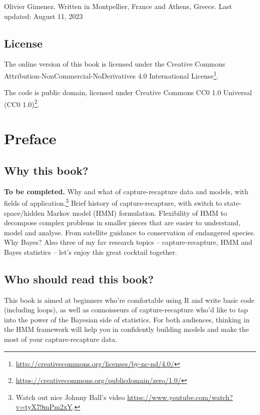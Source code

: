 \documentclass[
  12pt,
]{krantz}
\renewcommand{\href}[2]{#2\footnote{\url{#1}}}
\begin{document}
Olivier Gimenez. Written in Montpellier, France and Athens, Greece.
Last updated: August 11, 2023

\hypertarget{license}{%
\section*{License}\label{license}}


The online version of this book is licensed under the \href{http://creativecommons.org/licenses/by-nc-nd/4.0/}{Creative Commons Attribution-NonCommercial-NoDerivatives 4.0 International License}.

The code is public domain, licensed under \href{https://creativecommons.org/publicdomain/zero/1.0/}{Creative Commons CC0 1.0 Universal (CC0 1.0)}.

\hypertarget{preface}{%
\chapter*{Preface}\label{preface}}


\hypertarget{why-this-book}{%
\section*{Why this book?}\label{why-this-book}}


\textbf{To be completed.} Why and what of capture-recapture data and models, with fields of application.\footnote{Watch out nice Johnny Ball's video \url{https://www.youtube.com/watch?v=tyX79mPm2xY}.} Brief history of capture-recapture, with switch to state-space/hidden Markov model (HMM) formulation. Flexibility of HMM to decompose complex problems in smaller pieces that are easier to understand, model and analyse. From satellite guidance to conservation of endangered species. Why Bayes? Also three of my fav research topics -- capture-recapture, HMM and Bayes statistics -- let's enjoy this great cocktail together.

\hypertarget{who-should-read-this-book}{%
\section*{Who should read this book?}\label{who-should-read-this-book}}


This book is aimed at beginners who're comfortable using R and write basic code (including loops), as well as connoisseurs of capture-recapture who'd like to tap into the power of the Bayesian side of statistics. For both audiences, thinking in the HMM framework will help you in confidently building models and make the most of your capture-recapture data.
\end{document}

